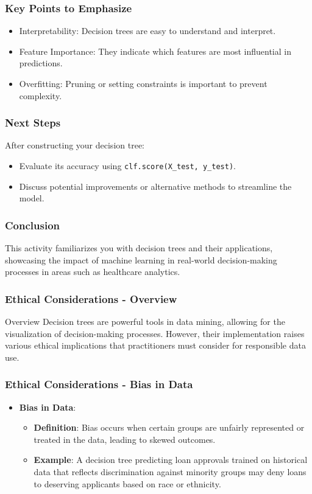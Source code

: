 \documentclass[aspectratio=169]{beamer}
\begin{document}
\begin{frame}
    \frametitle{Key Points to Emphasize}
    \begin{itemize}
        \item Interpretability: Decision trees are easy to understand and interpret.
        \item Feature Importance: They indicate which features are most influential in predictions.
        \item Overfitting: Pruning or setting constraints is important to prevent complexity.
    \end{itemize}
\end{frame}

\begin{frame}
    \frametitle{Next Steps}
    After constructing your decision tree:
    \begin{itemize}
        \item Evaluate its accuracy using \texttt{clf.score(X\_test, y\_test)}.
        \item Discuss potential improvements or alternative methods to streamline the model.
    \end{itemize}
\end{frame}

\begin{frame}
    \frametitle{Conclusion}
    This activity familiarizes you with decision trees and their applications, showcasing the impact of machine learning in real-world decision-making processes in areas such as healthcare analytics.
\end{frame}

\begin{frame}[fragile]
    \frametitle{Ethical Considerations - Overview}
    \begin{block}{Overview}
        Decision trees are powerful tools in data mining, allowing for the visualization of decision-making processes. 
        However, their implementation raises various ethical implications that practitioners must consider for responsible data use.
    \end{block}
\end{frame}

\begin{frame}[fragile]
    \frametitle{Ethical Considerations - Bias in Data}
    \begin{itemize}
        \item \textbf{Bias in Data}:
        \begin{itemize}
            \item \textbf{Definition}: Bias occurs when certain groups are unfairly represented or treated in the data, leading to skewed outcomes.
            \item \textbf{Example}: A decision tree predicting loan approvals trained on historical data that reflects discrimination against minority groups may deny loans to deserving applicants based on race or ethnicity.
        \end{itemize}
    \end{itemize}
\end{frame}
\end{document}
